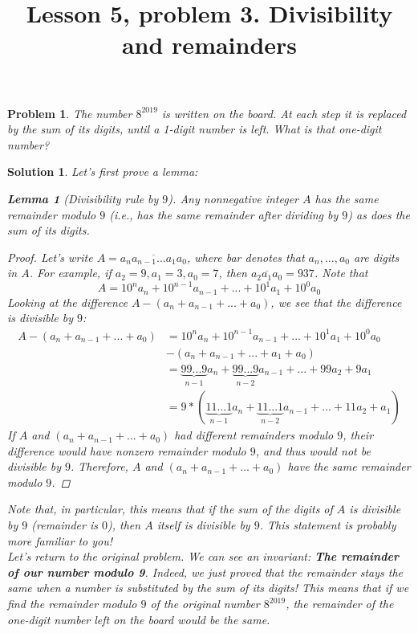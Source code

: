 \documentclass[a4paper,12pt]{article}
\title{Lesson 5, problem 3. Divisibility and remainders}
\theoremstyle{perfect}
\newtheorem{lem}{Lemma}
\newtheorem{prb}{Problem}
\newtheorem{sol}{Solution}
\begin{document}
 
\maketitle

\begin{prb}
The number $8^{2019}$ is written on the board. At each step it is replaced by the sum of its digits, until a 1-digit number is left. What is that one-digit number?
\end{prb}

\begin{sol}
Let's first prove a lemma:
\begin{lem}[Divisibility rule by $9$]
Any nonnegative integer $A$ has the same remainder modulo $9$ (i.e., has the same remainder after dividing by $9$) as does the sum of its digits. 
\end{lem}
\begin{proof}
Let's write $A = \overline{a_na_{n-1}...a_1a_0}$, where bar denotes that $a_n,...,a_0$ are digits in $A$. For example, if $a_2 = 9, a_1 = 3, a_0 = 7$, then $\overline{a_2a_1a_0} = 937$. Note that 
$$A = 10^na_n + 10^{n-1}a_{n-1}+ ... + 10^1a_1 + 10^0a_0$$
Looking at the difference $A - (a_n + a_{n-1} + ... + a_0)$, we see that the difference is divisible by $9$:
\begin{align*}
A - (a_n  +  a_{n-1} + ... + a_0) &= 10^na_n + 10^{n-1}a_{n-1}+ ... + 10^1a_1 + 10^0a_0 \\ 
& - ( a_n +  a_{n-1} + ... +  a_1 +  a_0) \\
&=  \underbrace{99...9}_{n-1} a_n + \underbrace{99...9}_{n-2} a_{n-1} + ... + 99a_2 + 9a_1\\
&= 9*(\underbrace{11...1}_{n-1} a_n + \underbrace{11...1}_{n-2} a_{n-1} + ... + 11a_2 + a_1)
\end{align*} 
If $A$ and $(a_n  +  a_{n-1} + ... + a_0)$ had different remainders modulo $9$, their difference would have nonzero remainder modulo $9$, and thus would not be divisible by $9$. Therefore, $A$ and $(a_n  +  a_{n-1} + ... + a_0)$ have the same remainder modulo $9$. 
\end{proof}

\noindent
Note that, in particular, this means that if the sum of the digits of $A$ is divisible by $9$ (remainder is $0$), then $A$ itself is divisible by $9$. This statement is probably more familiar to you! \\

\noindent
Let's return to the original problem. We can see an invariant:
\textbf{The remainder of our number modulo 9}. Indeed, we just proved that the remainder stays the same when a number is substituted by the sum of its digits! 
This means that if we find the remainder modulo $9$ of the original number $8^{2019}$, the remainder of the one-digit number left on the board would be the same.


\end{sol}
\end{document}
